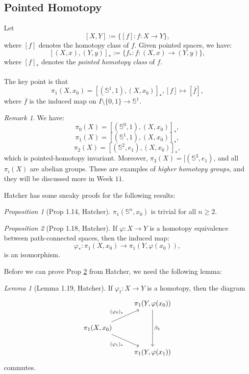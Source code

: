 \documentclass[a4paper]{report}
\theoremstyle{definition}
\theoremstyle{remark}
\newtheorem{remark}{Remark}
\theoremstyle{proposition}
\newtheorem{proposition}{Proposition}
\theoremstyle{conjecture}
\theoremstyle{lemma}
\newtheorem{lemma}{Lemma}
\theoremstyle{corollary}
\theoremstyle{exercise}
\begin{document}
\subsection{Pointed Homotopy}

Let $$[X,Y] := \lbrace [f] : f : X \to Y\rbrace,$$
where $[f]$ denotes the homotopy class of $f$.
Given pointed spaces, we have:
$$[(X,x), (Y,y)]_\ast := \lbrace f_\ast : f : (X,x) \longrightarrow (Y,y)\rbrace,$$
where $[f]_\ast$ denotes the \emph{pointed homotopy class} of $f$.\\\\
The key point is that 
$$\pi_1(X,x_0) = [(\mathbb{S}^1,1), (X,x_0)]_\ast, [f] \longmapsto [\overline{f}],$$
where $\overline{f}$ is the induced map on 
$I\setminus \lbrace 0,1\rbrace \to \mathbb{S}^1$.

\begin{remark}
    We have:
    $$\pi_0(X) = [(\mathbb{S}^0,1), (X,x_0)]_\ast,$$
    $$\pi_1(X) = [(\mathbb{S}^1,1), (X,x_0)]_\ast,$$
    $$\pi_2(X) = [(\mathbb{S}^2,e_1), (X,x_0)]_\ast,$$
    which is pointed-homotopy invariant.
    Moreover, $\pi_3(X) = [(\mathbb{S}^3,e_1)$,
    and all $\pi_i(X)$ are abelian groups. These are examples
    of \emph{higher homotopy groups}, and they will be discussed more in Week 
    $11$.
\end{remark}

Hatcher has some sneaky proofs for the following results:

\begin{proposition}[Prop 1.14, Hatcher]\label{prop1.14}
    $\pi_1(\mathbb{S}^n,x_0)$ is trivial for all $n \geq 2$.
\end{proposition}

\begin{proposition}[Prop 1.18, Hatcher]\label{prop1.18}
    If $\varphi : X \to Y$ is a homotopy equivalence between
    path-connected spaces, then the induced map:
    $$\varphi_\ast :  \pi_1(X,x_0) \longrightarrow \pi_1(Y,\varphi(x_0)),$$
    is an isomorphism.
\end{proposition}

Before we can prove Prop \ref{prop1.18} from Hatcher, we need the following 
lemma:

\begin{lemma}[Lemma 1.19, Hatcher]\label{lem1.19}
    If $\varphi_t : X \to Y$ is a homotopy, then the diagram $$\begin{tikzcd}
                                                                              & {\pi_1(Y,\varphi(x_0))} \arrow[dd, "\beta_h"] \\
{\pi_1(X,x_0)} \arrow[ru, "(\varphi_0)_\ast"] \arrow[rd, "(\varphi_1)_\ast"'] &                                               \\
                                                                              & {\pi_1(Y,\varphi(x_1))}                      
\end{tikzcd}$$
    commutes.
\end{lemma}
\end{document}
